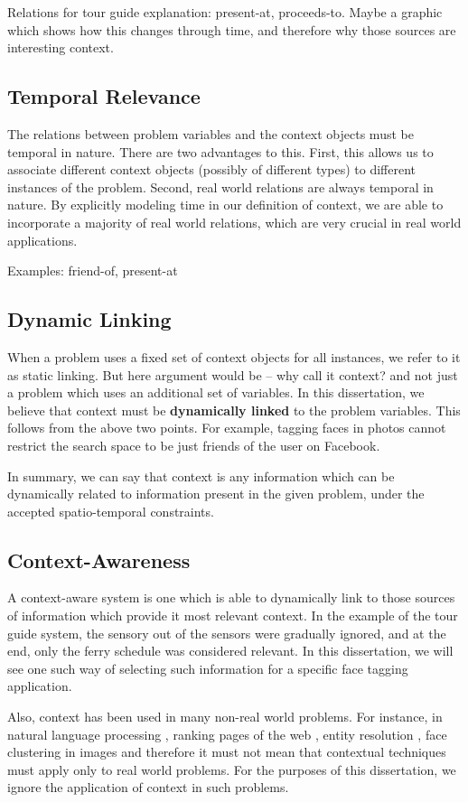 Relations for tour guide explanation: present-at, proceeds-to. Maybe a graphic which shows how this changes through time, and therefore why those sources are interesting context.

\subsection{Temporal Relevance}
The relations between problem variables and the context objects must be temporal in nature. There are two advantages to this. First, this allows us to associate different context objects (possibly of different types) to different instances of the problem. Second, real world relations are always temporal in nature. By explicitly modeling time in our definition of context, we are able to incorporate a majority of real world relations, which are very crucial in real world applications.

Examples: friend-of, present-at

\subsection{Dynamic Linking}
When a problem uses a fixed set of context objects for all instances, we refer to it as static linking. But here argument would be -- why call it context? and not just a problem which uses an additional set of variables. In this dissertation, we believe that context must be \textbf{dynamically linked} to the problem variables. This follows from the above two points. For example, tagging faces in photos cannot restrict the search space to be just friends of the user on Facebook. 

In summary, we can say that context is any information which can be dynamically related to information present in the given problem, under the accepted spatio-temporal constraints.

\subsection{Context-Awareness}
A context-aware system is one which is able to dynamically link to those sources of information which provide it most relevant context. In the example of the tour guide system, the sensory out of the sensors were gradually ignored, and at the end, only the ferry schedule was considered relevant. In this dissertation, we will see one such way of selecting such information for a specific face tagging application. 

Also, context has been used in many non-real world problems. For instance, in natural language processing \cite{lee1990context}, ranking pages of the web \cite{page1999pagerank}, entity resolution \cite{chen2009exploiting}, face clustering in images \cite{zhang2013unified} and therefore it must not mean that contextual techniques must apply only to real world problems. For the purposes of this dissertation, we ignore the application of context in such problems.

